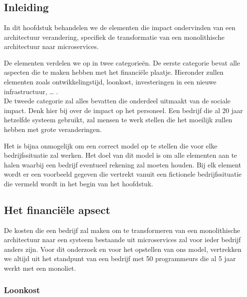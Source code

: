 
\chapter{}
\label{ch:model}



\section{Inleiding}

In dit hoofdstuk behandelen we de elementen die impact ondervinden van een architectuur verandering, specifiek de transformatie van een monolithische architectuur naar microservices.

De elementen verdelen we op in twee categorieën. De eerste categorie bevat alle aspecten die te maken hebben met het financiële plaatje. Hieronder zullen elementen zoals ontwikkelingstijd, loonkost, investeringen in een nieuwe infrastructuur, … . \\
De tweede categorie zal alles bevatten die onderdeel uitmaakt van de sociale impact. Denk hier bij over de impact op het personeel. Een bedrijf die al 20 jaar hetzelfde systeem gebruikt, zal mensen te werk stellen die het moeilijk zullen hebben met grote veranderingen.

Het is bijna onmogelijk om een correct model op te stellen die voor elke bedrijfssituatie zal werken. Het doel van dit model is om alle elementen aan te halen waarbij een bedrijf eventueel rekening zal moeten houden. Bij elk element wordt er een voorbeeld gegeven die vertrekt vanuit een fictionele bedrijfssituatie die vermeld wordt in het begin van het hoofdstuk.

\section{Het financiële apsect}

De kosten die een bedrijf zal maken om te transformeren van een monolithische architectuur naar een systeem bestaande uit microservices zal voor ieder bedrijf anders zijn. Voor dit onderzoek en voor het opstellen van ons model, vertrekken we altijd uit het standpunt van een bedrijf met 50 programmeurs die al 5 jaar werkt met een monoliet. 

\subsection{Loonkost}

